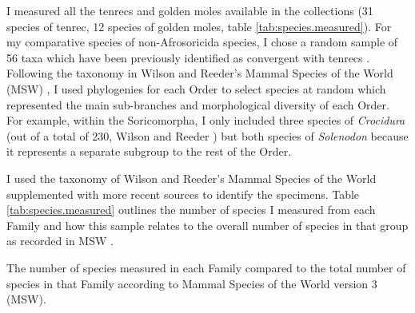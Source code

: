 
	I measured all the tenrecs and golden moles available in the collections (31 species of tenrec, 12 species of golden moles, table \ref{tab:species.measured}). %
	For my comparative species of non-Afrosoricida species, I chose a random sample of 56 taxa 
	which have been previously identified as convergent with tenrecs \citep[e.g.][]{Gould1966, Symonds2005, Poux2008, Olson2013}. 
	Following the taxonomy in Wilson and Reeder's Mammal Species of the World (MSW) \citeyearpar{Wilson2005}, I used phylogenies for each Order to select species at random which represented the main sub-branches and morphological diversity of each Order. For example, within the Soricomorpha, I only included three %
	species of \textit{Crocidura} (out of a total of 230, Wilson and Reeder \citeyear{Wilson2005}) but both species of \textit{Solenodon} because it represents a separate subgroup to the rest of the Order. 

	I used the taxonomy of Wilson and Reeder's Mammal Species of the World \citeyearpar[MSW,][]{Wilson2005} supplemented with more recent sources \citep[e.g.][]{Olson2013, Soarimalala2011} to identify the specimens. %
	Table \ref{tab:species.measured} outlines the number of species I measured from each Family and how this sample relates to the overall number of species in that group as recorded in MSW \citeyearpar{Wilson2005}. %



\begin{table}[h]
	\caption[Species measured] 
	{The number of species measured in each Family compared to the total number of species in that Family according to Mammal Species of the World version 3 \citeyear{Wilson2005} (MSW).}
		
	\label{tab:species.measured}
\end{table}
 
